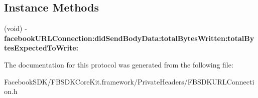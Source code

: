 \subsection*{Instance Methods}
\begin{DoxyCompactItemize}
\item 
\hypertarget{protocol_f_b_s_d_k_u_r_l_connection_delegate-p_aeecdb14c4bfa76b2c38232c966490615}{(void) -\/ {\bfseries facebook\-U\-R\-L\-Connection\-:did\-Send\-Body\-Data\-:total\-Bytes\-Written\-:total\-Bytes\-Expected\-To\-Write\-:}}\label{protocol_f_b_s_d_k_u_r_l_connection_delegate-p_aeecdb14c4bfa76b2c38232c966490615}

\end{DoxyCompactItemize}


The documentation for this protocol was generated from the following file\-:\begin{DoxyCompactItemize}
\item 
Facebook\-S\-D\-K/\-F\-B\-S\-D\-K\-Core\-Kit.\-framework/\-Private\-Headers/F\-B\-S\-D\-K\-U\-R\-L\-Connection.\-h\end{DoxyCompactItemize}
